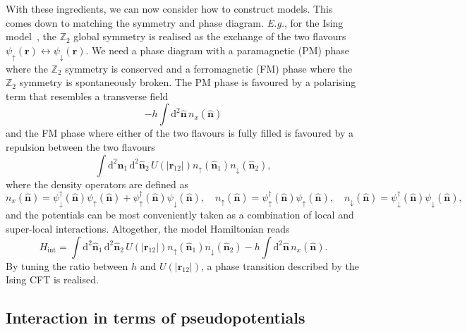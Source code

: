 \documentclass{timesjhep}
\begin{document}
With these ingredients, we can now consider how to construct models. This comes down to matching the symmetry and phase diagram. \textit{E.g.}, for the Ising model~\cite{Zhu2022}, the $\mathbb{Z}_2$ global symmetry is realised as the exchange of the two flavours $\psi_\uparrow(\mathbf{r})\leftrightarrow\psi_\downarrow(\mathbf{r})$. We need a phase diagram with a paramagnetic (PM) phase where the $\mathbb{Z}_2$ symmetry is conserved and a ferromagnetic (FM) phase where the $\mathbb{Z}_2$ symmetry is spontaneously broken. The PM phase is favoured by a polarising term that resembles a transverse field
\begin{equation*}
    -h\int\mathrm{d}^2\hat{\mathbf{n}}\,n_x(\hat{\mathbf{n}})
\end{equation*}
and the FM phase where either of the two flavours is fully filled is favoured by a repulsion between the two flavours
\begin{equation*}
    \int\mathrm{d}^2\hat{\mathbf{n}}_1\,\mathrm{d}^2\hat{\mathbf{n}}_2\,U(|\mathbf{r}_{12}|)n_\uparrow(\hat{\mathbf{n}}_1)n_\downarrow(\hat{\mathbf{n}}_2),
\end{equation*}
where the density operators are defined as
\begin{equation*}
    n_x(\hat{\mathbf{n}})=\psi^\dagger_\downarrow(\hat{\mathbf{n}})\psi_\uparrow(\hat{\mathbf{n}})+\psi^\dagger_\uparrow(\hat{\mathbf{n}})\psi_\downarrow(\hat{\mathbf{n}}),\quad n_\uparrow(\hat{\mathbf{n}})=\psi^\dagger_\uparrow(\hat{\mathbf{n}})\psi_\uparrow(\hat{\mathbf{n}}),\quad n_\downarrow(\hat{\mathbf{n}})=\psi^\dagger_\downarrow(\hat{\mathbf{n}})\psi_\downarrow(\hat{\mathbf{n}}),
\end{equation*}
and the potentials can be most conveniently taken as a combination of local and super-local interactions. Altogether, the model Hamiltonian reads
\begin{equation}
    H_\textrm{int}=\int\mathrm{d}^2\hat{\mathbf{n}}_1\,\mathrm{d}^2\hat{\mathbf{n}}_2\,U(|\mathbf{r}_{12}|)n_\uparrow(\hat{\mathbf{n}}_1)n_\downarrow(\hat{\mathbf{n}}_2)-h\int\mathrm{d}^2\hat{\mathbf{n}}\,n_x(\hat{\mathbf{n}}).
    \label{eq:ising_hmt}
\end{equation}
By tuning the ratio between $h$ and $U(|\mathbf{r}_{12}|)$, a phase transition described by the Ising CFT is realised.

\subsection{Interaction in terms of pseudopotentials}
\label{sec:construct_pspot}
\end{document}
